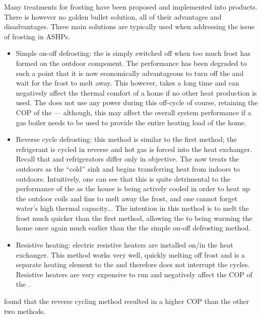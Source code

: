 Many treatments for frosting have been proposed and implemented into products. There is however no golden bullet solution, all of their advantages and disadvantages. Three main solutions are typically used when addressing the issue of frosting in \acp{ASHP}. 
\begin{itemize}
    \item Simple on-off defrosting: the \HP is simply switched off when too much frost has formed on the outdoor component. The performance has been degraded to such a point that it is now economically advantageous to turn off the \HP and wait for the frost to melt away. This however, takes a long time and can negatively affect the thermal comfort of a home if no other heat production is used. The \HP does not use any power during this off-cycle of course, retaining the \ac{COP} of the \HP --- although, this may affect the overall system performance if a gas boiler needs to be used to provide the entire heating load of the home.
    \item Reverse cycle defrosting: this method is similar to the first method; the refrigerant is cycled in reverse and hot gas is forced into the heat exchanger. Recall that \HPs and refrigerators differ only in objective. The \HP now treats the outdoors as the ``cold'' sink and begins transferring heat from indoors to outdoors. Intuitively, one can see that this is quite detrimental to the performance of the \HP as the house is being actively cooled in order to heat up the outdoor coils and fins to melt away the frost, and one cannot forget water's high thermal capacity... The intention in this method is to melt the frost much quicker than the first method, allowing the \ASHP to being warming the home once again much earlier than the the simple on-off defrosting method.
    \item Resistive heating: electric resistive heaters are installed on/in the heat exchanger. This method works very well, quickly melting off frost and is a separate heating element to the \HP and therefore does not interrupt the \HPs cycles. Resistive heaters are very expensive to run and negatively affect the \ac{COP} of the \HP.
\end{itemize}

\cite{amer_review_2017} found that the reverse cycling method resulted in a higher \ac{COP} than the other two methods. 

